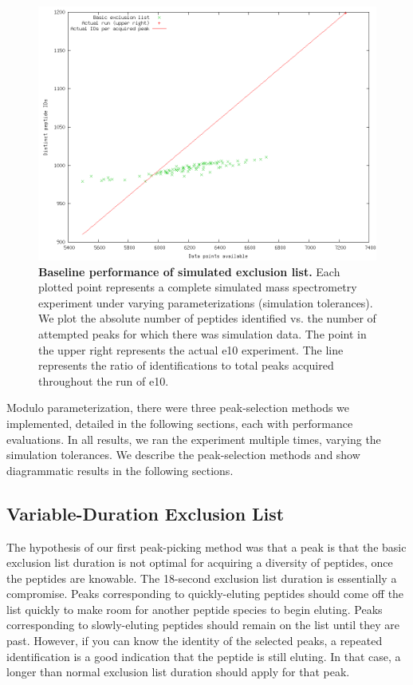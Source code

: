 \documentclass[12pt,twoside,openright]{report}
\begin{document}
\begin{figure}
\centering
\includegraphics[width=6.0in]{1_excl2.png}
\caption[Baseline performance of simulated exclusion list]{{\bf Baseline
    performance of simulated exclusion list.} Each plotted point represents a
  complete simulated mass spectrometry experiment under varying
  parameterizations (simulation tolerances). We plot the absolute number of
  peptides identified vs. the number of attempted peaks for which there was
  simulation data. The point in the upper right represents the actual e10
  experiment. The line represents the ratio of identifications to total peaks
  acquired throughout the run of e10.
  \label{figure:baseline}}
\end{figure}

Modulo parameterization, there were three peak-selection methods we implemented,
detailed in the following sections, each with performance evaluations. In all
results, we ran the experiment multiple times, varying the simulation
tolerances. We describe the peak-selection methods and show diagrammatic results
in the following sections.

\subsection{Variable-Duration Exclusion List}

The hypothesis of our first peak-picking method was that a peak is that the
basic exclusion list duration is not optimal for acquiring a diversity of
peptides, once the peptides are knowable. The 18-second exclusion list duration
is essentially a compromise. Peaks corresponding to quickly-eluting peptides
should come off the list quickly to make room for another peptide species to
begin eluting. Peaks corresponding to slowly-eluting peptides should remain on
the list until they are past. However, if you can know the identity of the
selected peaks, a repeated identification is a good indication that the peptide
is still eluting. In that case, a longer than normal exclusion list duration
should apply for that peak.
\end{document}
